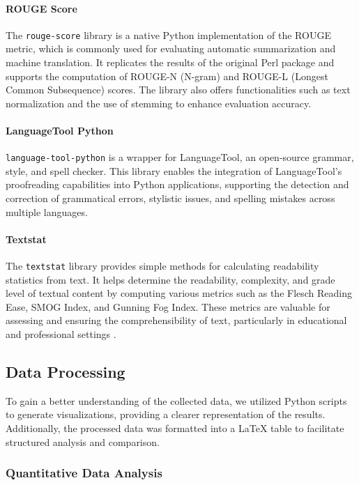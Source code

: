 \paragraph{ROUGE Score}
The \texttt{rouge-score} library is a native Python implementation of the ROUGE metric, which is commonly used for evaluating automatic summarization and machine translation. It replicates the results of the original Perl package and supports the computation of ROUGE-N (N-gram) and ROUGE-L (Longest Common Subsequence) scores. The library also offers functionalities such as text normalization and the use of stemming to enhance evaluation accuracy.
\cite{r_sc_li}

\paragraph{LanguageTool Python}
\texttt{language-tool-python} is a wrapper for LanguageTool, an open-source grammar, style, and spell checker. This library enables the integration of LanguageTool's proofreading capabilities into Python applications, supporting the detection and correction of grammatical errors, stylistic issues, and spelling mistakes across multiple languages.

\paragraph{Textstat}
The \texttt{textstat} library provides simple methods for calculating readability statistics from text. It helps determine the readability, complexity, and grade level of textual content by computing various metrics such as the Flesch Reading Ease, SMOG Index, and Gunning Fog Index. These metrics are valuable for assessing and ensuring the comprehensibility of text, particularly in educational and professional settings \cite{textstat}.


\subsection{Data Processing}

To gain a better understanding of the collected data, we utilized Python scripts to generate visualizations, 
providing a clearer representation of the results. Additionally, the processed data was formatted into a LaTeX table to facilitate structured analysis and comparison.

\subsubsection{Quantitative Data Analysis}

